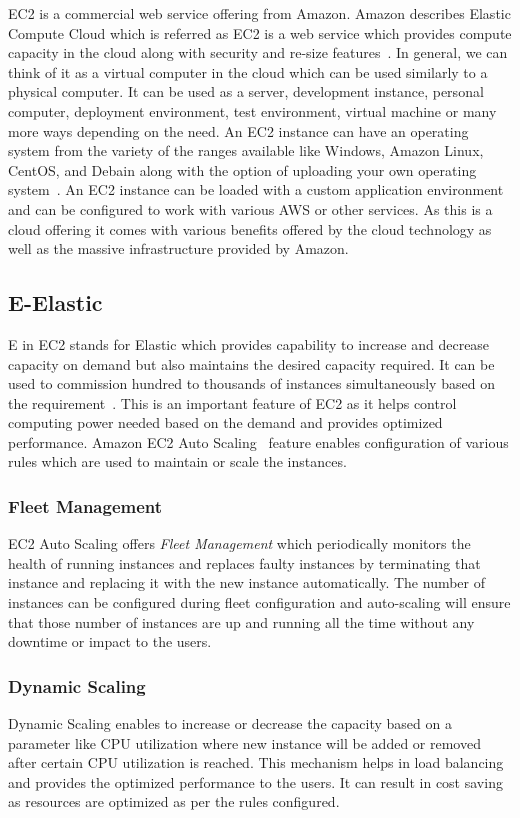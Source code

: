 EC2 is a commercial web service offering from Amazon. Amazon describes
Elastic Compute Cloud which is referred as EC2 is a web service which
provides compute capacity in the cloud along with security and re-size
features~\cite{hid-sp18-402-www-aws-ec2}. In general, we can think of
it as a virtual computer in the cloud which can be used similarly to a
physical computer. It can be used as a server, development instance,
personal computer, deployment environment, test environment, virtual
machine or many more ways depending on the need. An EC2 instance can
have an operating system from the variety of the ranges available like
Windows, Amazon Linux, CentOS, and Debain along with the option of
uploading your own operating
system~\cite{hid-sp18-402-www-aws-ec2-details}. An EC2 instance can be
loaded with a custom application environment and can be configured to
work with various AWS or other services. As this is a cloud offering
it comes with various benefits offered by the cloud technology as well
as the massive infrastructure provided by Amazon.

\subsection{E-Elastic}
E in EC2 stands for Elastic which provides capability to increase and
decrease capacity on demand but also maintains the desired capacity
required. It can be used to commission hundred to thousands of
instances simultaneously based on the
requirement~\cite{hid-sp18-402-www-aws-ec2}. This is an important
feature of EC2 as it helps control computing power needed based on the
demand and provides optimized performance.  Amazon EC2 Auto
Scaling~\cite{hid-sp18-402-www-aws-ec2autoscaling} feature enables
configuration of various rules which are used to maintain or scale the
instances.
\subsubsection{Fleet Management}
EC2 Auto Scaling offers \emph{Fleet Management} which periodically
monitors the health of running instances and replaces faulty instances
by terminating that instance and replacing it with the new instance
automatically. The number of instances can be configured during fleet
configuration and auto-scaling will ensure that those number of
instances are up and running all the time without any downtime or
impact to the users.
\subsubsection{Dynamic Scaling}
Dynamic Scaling enables to increase or decrease the capacity based on
a parameter like CPU utilization where new instance will be added or
removed after certain CPU utilization is reached. This mechanism helps
in load balancing and provides the optimized performance to the
users. It can result in cost saving as resources are optimized as per
the rules configured.


